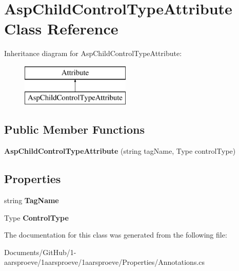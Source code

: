 \hypertarget{class_asp_child_control_type_attribute}{}\section{Asp\+Child\+Control\+Type\+Attribute Class Reference}
\label{class_asp_child_control_type_attribute}
Inheritance diagram for Asp\+Child\+Control\+Type\+Attribute\+:\begin{figure}[H]
\begin{center}
\leavevmode
\includegraphics[height=2.000000cm]{class_asp_child_control_type_attribute}
\end{center}
\end{figure}
\subsection*{Public Member Functions}
\begin{DoxyCompactItemize}
\item 
\hypertarget{class_asp_child_control_type_attribute_ad547dcf065ac2d1092f0cce82cc26fe7}{}{\bfseries Asp\+Child\+Control\+Type\+Attribute} (string tag\+Name, Type control\+Type)\label{class_asp_child_control_type_attribute_ad547dcf065ac2d1092f0cce82cc26fe7}

\end{DoxyCompactItemize}
\subsection*{Properties}
\begin{DoxyCompactItemize}
\item 
\hypertarget{class_asp_child_control_type_attribute_a9e30613d70a3bcffb32a4664a5d121d2}{}string {\bfseries Tag\+Name}\label{class_asp_child_control_type_attribute_a9e30613d70a3bcffb32a4664a5d121d2}

\item 
\hypertarget{class_asp_child_control_type_attribute_a6c6421f394baa882056b2dfc3efcd284}{}Type {\bfseries Control\+Type}\label{class_asp_child_control_type_attribute_a6c6421f394baa882056b2dfc3efcd284}

\end{DoxyCompactItemize}


The documentation for this class was generated from the following file\+:\begin{DoxyCompactItemize}
\item 
Documents/\+Git\+Hub/1-\/aarsproeve/1aarsproeve/1aarsproeve/\+Properties/Annotations.\+cs\end{DoxyCompactItemize}
